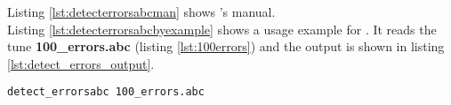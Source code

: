Listing \ref{lst:detecterrorsabcman} shows \detecterrorsabc{}'s manual.\\



Listing \ref{lst:detecterrorsabcbyexample} shows a usage example for \detecterrorsabc{}. It reads
the tune \textbf{100\_errors.abc} (listing \ref{lst:100errors}) and the output is shown in listing
\ref{lst:detect_errors_output}.\\

\begin{lstlisting}[caption={\detecterrorsabc{} by example},label={lst:detecterrorsabcbyexample},captionpos=t,abovecaptionskip=-\medskipamount]
detect_errorsabc 100_errors.abc
\end{lstlisting}




